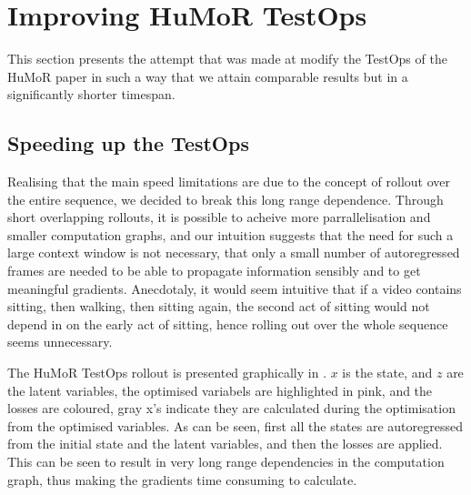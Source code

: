 \section{Improving HuMoR TestOps}
\label{sec:humor_improvement}

This section presents the attempt that was made at modify the TestOps of the HuMoR paper \cite{humor} in such a way that we attain comparable results but in a significantly shorter timespan.


\subsection{Speeding up the TestOps}

Realising that the main speed limitations are due to the concept of rollout over the entire sequence, we decided to break this long range dependence. Through short overlapping rollouts, it is possible to acheive more parrallelisation and smaller computation graphs, and our intuition suggests that the need for such a large context window is not necessary, that only a small number of autoregressed frames are needed to be able to propagate information sensibly and to get meaningful gradients. Anecdotaly, it would seem intuitive that if a video contains sitting, then walking, then sitting again, the second act of sitting would not depend in on the early act of sitting, hence rolling out over the whole sequence seems unnecessary.

The HuMoR TestOps rollout is presented graphically in . $x$ is the state, and $z$ are the latent variables, the optimised variabels are highlighted in pink, and the losses are coloured, gray x's indicate they are calculated during the optimisation from the optimised variables. As can be seen, first all the states are autoregressed from the initial state and the latent variables, and then the losses are applied. This can be seen to result in very long range dependencies in the computation graph, thus making the gradients time consuming to calculate. 

